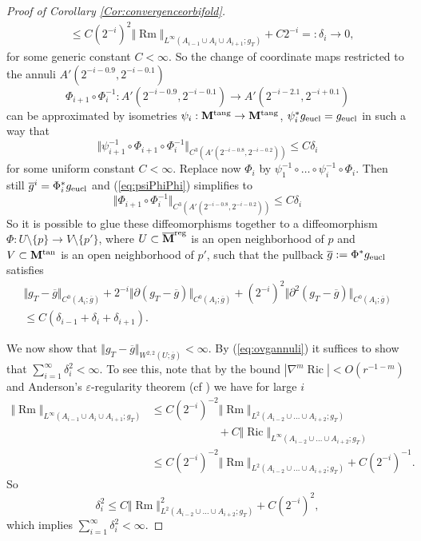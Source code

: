 \documentclass[11pt]{amsart}
\numberwithin{equation}{section}
\def\eps{\varepsilon}
\def\M{{\bf M}}
\def\eps{\varepsilon}
\DeclareMathOperator{\Ric}{Ric}
\DeclareMathOperator{\Rm}{Rm}
\numberwithin{equation}{section}
\begin{document}
\begin{proof}[Proof of Corollary \ref{Cor:convergenceorbifold}]
\begin{align*}
 &\leq  C (2^{-i})^2 \Vert {\Rm} \Vert_{L^\infty (A_{i-1} \cup A_i \cup A_{i+1}; g_T)}  + C 2^{-i} =: \delta_i \to 0, 
\end{align*}
for some generic constant $C < \infty$.
So the change of coordinate maps restricted to the annuli $A'(2^{-i-0.9}, 2^{-i-0.1})$
\[  \Phi_{i+1}  \circ \Phi_{i}^{-1} : A'(2^{-i-0.9}, 2^{-i-0.1})  \to A'(2^{-i-2.1}, 2^{-i+0.1}) \]
can be approximated by isometries $\psi_i : \M^{\textnormal{tang}} \to \M^{\textnormal{tang}}$, $\psi_i^* g_{\textnormal{eucl}} = g_{\textnormal{eucl}}$ in such a way that
\begin{equation} \label{eq:psiPhiPhi}
 \Vert \psi_{i+1}^{-1} \circ \Phi_{i+1}  \circ \Phi_{i}^{-1} \Vert_{C^3(A'(2^{-i-0.8}, 2^{-i-0.2}))} \leq C \delta_i 
\end{equation}
for some uniform constant $C < \infty$.
Replace now $\Phi_i$ by $\psi_1^{-1} \circ \ldots \circ \psi_i^{-1} \circ \Phi_i$.
Then still $\overline{g}^i = \Phi_i^* g_{\textnormal{eucl}}$ and (\ref{eq:psiPhiPhi}) simplifies to 
\[ \Vert \Phi_{i+1}  \circ \Phi_{i}^{-1} \Vert_{C^3(A'(2^{-i-0.8}, 2^{-i-0.2}))} \leq C \delta_i \]
So it is possible to glue these diffeomorphisms together to a diffeomorphism $\Phi : U \setminus \{ p \} \to V \setminus \{ p' \}$, where $U \subset \overline{\M}^{\textnormal{reg}}$ is an open neighborhood of $p$ and $V \subset \M^{\textnormal{tan}}$ is an open neighborhood of $p'$, such that the pullback $\overline{g} := \Phi^* g_{\textnormal{eucl}}$ satisfies
\begin{multline} \label{eq:ovgannuli}
  \Vert g_T - \overline{g} \Vert_{C^0 (A_i; \overline{g})} + 2^{-i} \Vert  \partial (g_T - \overline{g}) \Vert_{C^0 (A_i; \overline{g})}  + (2^{-i} )^2 \Vert \partial^2(g_T - \overline{g}) \Vert_{C^0 (A_i; \overline{g})} \\ \leq C (\delta_{i-1} + \delta_i + \delta_{i+1} ). 
\end{multline}

We now show that $\Vert g_T - \overline{g} \Vert_{W^{2,2} (U; \overline{g})} < \infty$.
By (\ref{eq:ovgannuli}) it suffices to show that $\sum_{i=1}^\infty \delta_i^2 < \infty$.
To see this, note that by the bound $|\nabla^m {\Ric}| < O(r^{-1-m})$ and Anderson's $\eps$-regularity theorem (cf \cite{Anderson-epsreg}) we have for large $i$
\begin{align*}
 \Vert {\Rm} \Vert_{L^\infty (A_{i-1} \cup A_i \cup A_{i+1} ; g_T )} &\leq C(2^{-i})^{-2} \Vert {\Rm} \Vert_{L^2 (A_{i-2} \cup \ldots \cup A_{i+2}; g_T)} \\
 &\qquad\qquad\qquad + C \Vert {\Ric} \Vert_{L^\infty (A_{i-2} \cup \ldots \cup A_{i+2}; g_T)} \\
 &\leq C(2^{-i})^{-2} \Vert {\Rm} \Vert_{L^2 (A_{i-2} \cup \ldots \cup A_{i+2}; g_T)} + C (2^{-i})^{-1}.
\end{align*}
So
\[ \delta_i^2 \leq C \Vert {\Rm} \Vert_{L^2 (A_{i-2} \cup \ldots \cup A_{i+2}; g_T)}^2 + C (2^{-i})^2, \]
which implies $\sum_{i=1}^\infty \delta_i^2 < \infty$.


\end{proof}
\end{document}
